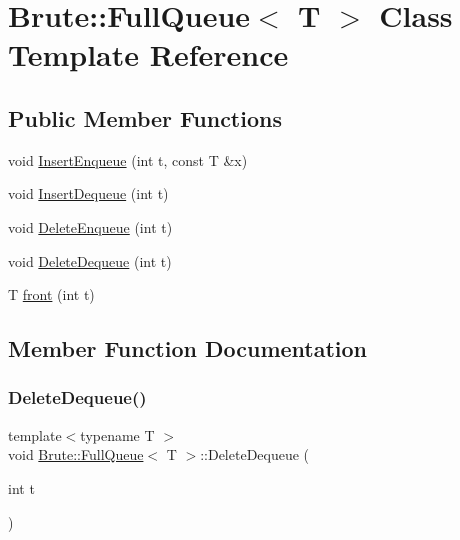 \hypertarget{classBrute_1_1FullQueue}{}\section{Brute\+:\+:Full\+Queue$<$ T $>$ Class Template Reference}
\label{classBrute_1_1FullQueue}
\subsection*{Public Member Functions}
\begin{DoxyCompactItemize}
\item 
void \hyperlink{classBrute_1_1FullQueue_a66fc3903f5ed07f915aa46647c90e13e}{Insert\+Enqueue} (int t, const T \&x)
\item 
void \hyperlink{classBrute_1_1FullQueue_a6e8ca9970051d1965566dc296973ac1d}{Insert\+Dequeue} (int t)
\item 
void \hyperlink{classBrute_1_1FullQueue_a4bcd30eecb8f5120ddb680473890474b}{Delete\+Enqueue} (int t)
\item 
void \hyperlink{classBrute_1_1FullQueue_ad7bb857a2d3ef1d21399985e6624eed4}{Delete\+Dequeue} (int t)
\item 
T \hyperlink{classBrute_1_1FullQueue_a36660da3e77471d20bb6db71537a01f1}{front} (int t)
\end{DoxyCompactItemize}


\subsection{Member Function Documentation}
\mbox{\label{classBrute_1_1FullQueue_ad7bb857a2d3ef1d21399985e6624eed4}} 
\subsubsection{\texorpdfstring{Delete\+Dequeue()}{DeleteDequeue()}}
{\footnotesize\ttfamily template$<$typename T $>$ \\
void \hyperlink{classBrute_1_1FullQueue}{Brute\+::\+Full\+Queue}$<$ T $>$\+::Delete\+Dequeue (\begin{DoxyParamCaption}\item[{int}]{t }\end{DoxyParamCaption})}

